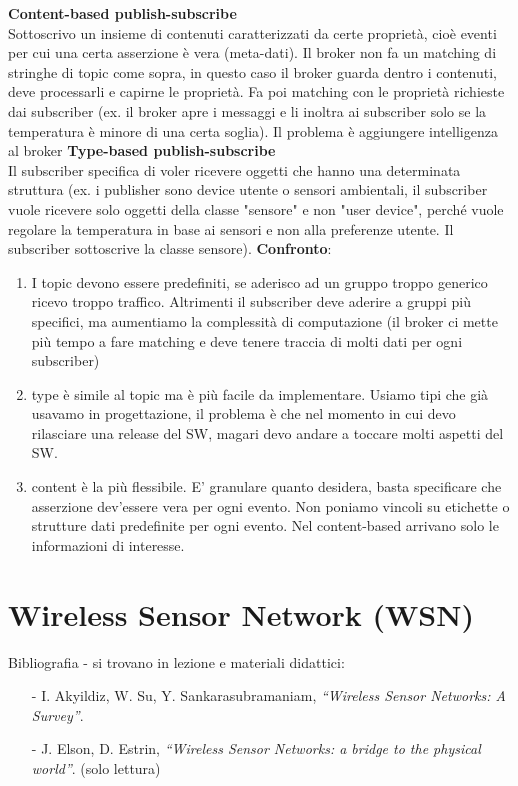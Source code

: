 \documentclass[12pt,italian]{report}
\begin{document}
\bigbreak
\noindent \textbf{Content-based publish-subscribe} \\
Sottoscrivo un insieme di contenuti caratterizzati da certe proprietà, cioè eventi per cui una certa asserzione è vera (meta-dati). Il broker non fa un matching di stringhe di topic come sopra, in questo caso il broker guarda dentro i contenuti, deve processarli e capirne le proprietà. Fa poi matching con le proprietà richieste dai subscriber (ex. il broker apre i messaggi e li inoltra ai subscriber solo se la temperatura è minore di una certa soglia).
Il problema è aggiungere intelligenza al broker
\bigbreak
\noindent \textbf{Type-based publish-subscribe} \\
Il subscriber specifica di voler ricevere oggetti che hanno una determinata struttura (ex. i publisher sono device utente o sensori ambientali, il subscriber vuole ricevere solo oggetti della classe "sensore" e non "user device", perché vuole regolare la temperatura in base ai sensori e non alla preferenze utente. Il subscriber sottoscrive la classe sensore).
\bigbreak
\noindent \textbf{Confronto}:
\begin{enumerate}
    \item I topic devono essere predefiniti, se aderisco ad un gruppo troppo generico ricevo troppo traffico. Altrimenti il subscriber deve aderire a gruppi più specifici, ma aumentiamo la complessità di computazione (il broker ci mette più tempo a fare matching e deve tenere traccia di molti dati per ogni subscriber)
    \item type è simile al topic ma è più facile da implementare. Usiamo tipi che già usavamo in progettazione, il problema è che nel momento in cui devo rilasciare una release del SW, magari devo andare a toccare molti aspetti del SW.
    \item content è la più flessibile. E' granulare quanto desidera, basta specificare che asserzione dev'essere vera per ogni evento. Non poniamo vincoli su etichette o strutture dati predefinite per ogni evento. Nel content-based arrivano solo le informazioni di interesse.
\end{enumerate}

\chapter{Wireless Sensor Network (WSN)}
\label{cap:wsn}
Bibliografia - si trovano in lezione e materiali didattici: 
\begin{itemize}
    \item[-] I. Akyildiz, W. Su, Y. Sankarasubramaniam, \textit{“Wireless
            Sensor Networks: A Survey”}.
    \item[-] J. Elson, D. Estrin, \textit{“Wireless Sensor Networks: a bridge to
            the physical world”}. (solo lettura)
\end{itemize}
\end{document}
